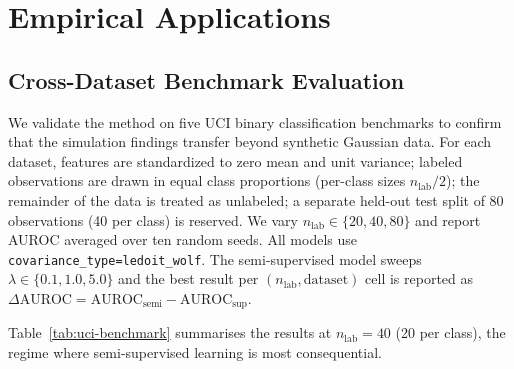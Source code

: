 \documentclass[11pt]{article}
\theoremstyle{definition}
\begin{document}
\section{Empirical Applications}
\label{sec:empirical}

\subsection{Cross-Dataset Benchmark Evaluation}
\label{sec:empirical-benchmark}

We validate the method on five UCI binary classification benchmarks
to confirm that the simulation findings transfer beyond synthetic Gaussian data.
For each dataset, features are standardized to zero mean and unit variance;
labeled observations are drawn in equal class proportions (per-class sizes
$n_{\text{lab}}/2$); the remainder of the data is treated as unlabeled;
a separate held-out test split of 80 observations (40 per class) is reserved.
We vary $n_{\text{lab}} \in \{20, 40, 80\}$ and report AUROC averaged over ten
random seeds.  All models use \texttt{covariance\_type=ledoit\_wolf}.
The semi-supervised model sweeps $\lambda \in \{0.1, 1.0, 5.0\}$ and the best
result per $(n_{\text{lab}}, \text{dataset})$ cell is reported as
$\Delta\text{AUROC} = \text{AUROC}_{\text{semi}} - \text{AUROC}_{\text{sup}}$.

Table~\ref{tab:uci-benchmark} summarises the results at $n_{\text{lab}} = 40$
(20 per class), the regime where semi-supervised learning is most consequential.
\end{document}
